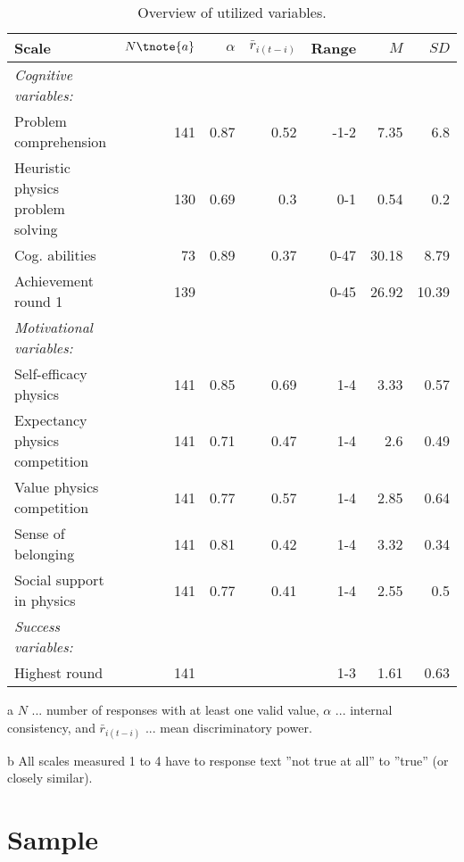 \documentclass[D:/studies/WinnerS/Erhebungen/IPhO1718/paper/problem_solving/main/TaylorFrancis/interactapasample]{subfiles}
\begin{document}
\begin{table}
\centering
\caption{Overview of utilized variables.}
\label{sample_measures_table}
\begin{threeparttable}
\begin{tabular}{lrrrrrr}
\toprule
Scale & $N\tnote{a}$ & $\alpha$ & $\bar{r}_{i(t-i)}$ & Range & $M$ & $SD$ \\ 
  \midrule
\textit{Cognitive variables:} &  &  &  &  &  &  \\ 
  Problem comprehension & 141 & 0.87 & 0.52 & -1-2 & 7.35 & 6.8 \\ 
  Heuristic physics problem solving & 130 & 0.69 & 0.3 & 0-1 & 0.54 & 0.2 \\ 
  Cog. abilities & 73 & 0.89 & 0.37 & 0-47 & 30.18 & 8.79 \\ 
  Achievement round 1 & 139 &  &  & 0-45 & 26.92 & 10.39 \\ 
  \midrule \textit{Motivational variables:} &  &  &  &  &  &  \\ 
  Self-efficacy physics & 141 & 0.85 & 0.69 & 1-4\tnote{b} & 3.33 & 0.57 \\ 
  Expectancy physics competition & 141 & 0.71 & 0.47 & 1-4 & 2.6 & 0.49 \\ 
  Value physics competition & 141 & 0.77 & 0.57 & 1-4 & 2.85 & 0.64 \\ 
  Sense of belonging & 141 & 0.81 & 0.42 & 1-4 & 3.32 & 0.34 \\ 
  Social support in physics & 141 & 0.77 & 0.41 & 1-4 & 2.55 & 0.5 \\ 
  \midrule \textit{Success variables:} &  &  &  &  &  &  \\ 
  Highest round & 141 &  &  & 1-3 & 1.61 & 0.63 \\ 
   \bottomrule\end{tabular}
\begin{tablenotes}
\item[a] $N$ ... number of responses with at least one valid value, $\alpha$ ... internal consistency, and $\bar{r}_{i(t-i)}$ ... mean discriminatory power.
\item[b] All scales measured 1 to 4 have to response text ''not true at all'' to ''true'' (or closely similar).
\end{tablenotes}
\end{threeparttable}
\end{table}


\section{Sample}
\end{document}
